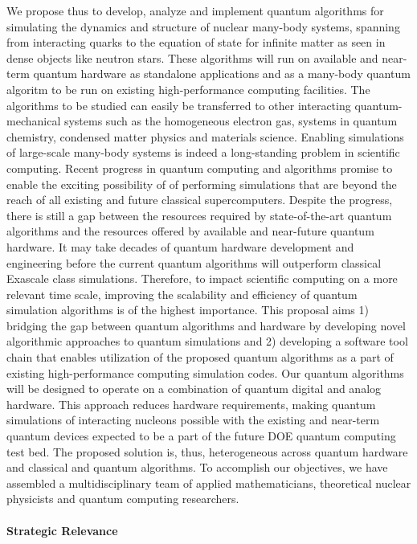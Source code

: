 \documentclass[10pt]{article}
\begin{document}
We propose thus to develop, analyze and implement quantum algorithms for simulating the dynamics and structure of nuclear many-body systems, spanning from interacting quarks to the equation of state for infinite matter as seen in dense objects like neutron stars. These algorithms will run on available and near-term quantum hardware as standalone applications and as a many-body quantum algoritm to be run on existing high-performance computing facilities. The algorithms to be studied can easily be transferred to other interacting quantum-mechanical systems such as the homogeneous electron gas, systems in quantum chemistry, condensed matter physics and materials science.  
Enabling simulations of large-scale many-body systems is indeed a long-standing problem in scientific computing. Recent progress in quantum computing and algorithms promise to enable the exciting possibility of of performing simulations that are beyond the reach of all existing and future classical supercomputers. Despite the progress, there is still a gap between the
resources required by state-of-the-art quantum algorithms and the resources offered by available and near-future
quantum hardware. It may take decades of quantum hardware development and engineering before
the current quantum algorithms will outperform classical Exascale class simulations. Therefore, to impact
scientific computing on a more relevant time scale, improving the scalability and efficiency of
quantum simulation algorithms is of the highest importance. This proposal aims 1) bridging
the gap between quantum algorithms  and hardware by developing novel algorithmic approaches to quantum
simulations and 2) developing a software tool chain that enables utilization of the proposed quantum algorithms as a
part of  existing high-performance computing simulation codes. Our quantum algorithms will be  designed to operate on a combination of quantum digital and analog
hardware. This approach reduces hardware requirements, making quantum simulations of interacting
nucleons possible with the existing and near-term quantum devices expected to be a part of
the future DOE quantum computing test bed. The proposed solution is, thus, heterogeneous across
quantum hardware and classical and quantum algorithms.
To accomplish our objectives, we have assembled a multidisciplinary team of 
applied mathematicians, theoretical nuclear physicists  and quantum computing
researchers.


\paragraph{Strategic Relevance}
\end{document}
